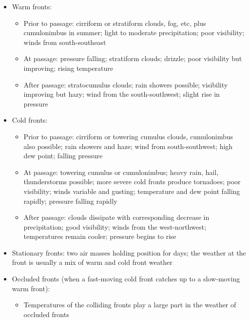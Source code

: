 \begin{itemize}
  \item Warm fronts:
    \begin{itemize}
      \item Prior to passage: cirriform or stratiform clouds, fog, etc, plus
        cumulonimbus in summer; light to moderate precipitation; poor
        visibility; winds from south-southeast

      \item At passage: pressure falling; stratiform clouds; drizzle; poor
        visibility but improving; rising temperature

      \item After passage: stratocumulus clouds; rain showers possible;
        visibility improving but hazy; wind from the south-southwest; slight
        rise in pressure
    \end{itemize}

  \item Cold fronts:
    \begin{itemize}
      \item Prior to passage: cirriform or towering cumulus clouds,
        cumulonimbus also possible; rain showers and haze; wind from
        south-southwest; high dew point; falling pressure

      \item At passage: towering cumulus or cumulonimbus; heavy rain, hail,
        thunderstorms possible; more severe cold fronts produce tornadoes; poor
        visibility; winds variable and gusting; temperature and dew point
        falling rapidly; pressure falling rapidly

      \item After passage: clouds dissipate with corresponding decrease in
        precipitation; good visibility; winds from the west-northwest;
        temperatures remain cooler; pressure begins to rise
    \end{itemize}

  \item Stationary fronts: two air masses holding position for days; the
    weather at the front is usually a mix of warm and cold front weather

  \item Occluded fronts (when a fast-moving cold front catches up to a
    slow-moving warm front):
    \begin{itemize}
      \item Temperatures of the colliding fronts play a large part in the
        weather of occluded fronts


\end{itemize}
\end{itemize}
